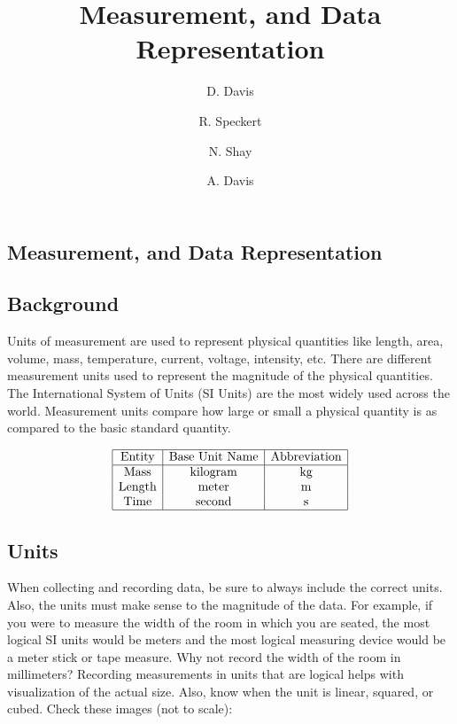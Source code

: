 \documentclass{ximera}
\author{D. Davis \and R. Speckert \and N. Shay \and A. Davis}
\title{Measurement, and Data Representation} \license{CC BY-NC-SA 4.0}
\begin{document}
\begin{abstract}
\end{abstract}
\maketitle

\begin{onlineOnly}
\section*{Measurement, and Data Representation}
\end{onlineOnly}
\subsection*{Background}
Units of measurement are used to represent physical quantities like length, area, volume, mass, temperature, current, voltage, intensity, etc.  There are different measurement units used to represent the magnitude of the physical quantities. The International System of Units (SI Units) are the most widely used across the world. Measurement units compare how large or small a physical quantity is as compared to the basic standard quantity.  

$$\begin{array}{|c|c|c|} 
 \hline \text{Entity}&\text{Base Unit Name}&\text{Abbreviation}\\ \hline \text{Mass}&\text{kilogram}&\text{kg}\\  \text{Length}&\text{meter}&\text{m}\\
 \text{Time} &\text{second}&\text{s}\\
  \hline 
 \end{array}$$

\subsection*{Units}
When collecting and recording data, be sure to always include the correct units.  Also, the units must make sense to the magnitude of the data.  For example, if you were to measure the width of the room in which you are seated, the most logical SI units would be meters and the most logical measuring device would be a meter stick or tape measure.  
Why not record the width of the room in millimeters?  
Recording measurements in units that are logical helps with visualization of the actual size.  
Also, know when the unit is linear, squared, or cubed.   Check these images (not to scale):
\end{document}
